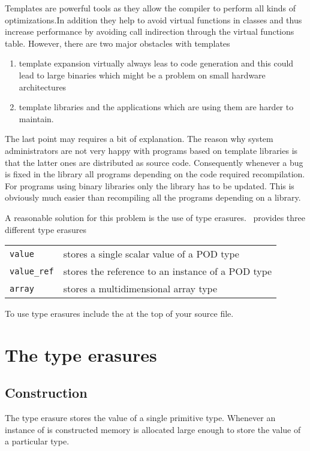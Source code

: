 
Templates are powerful tools as they allow the compiler to perform all kinds of
optimizations.In addition they help to avoid virtual functions in classes and
thus increase performance by avoiding call indirection through the virtual
functions table. However, there are two major obstacles with templates
\begin{enumerate}
\item template expansion virtually always leas to code generation and this could 
lead to large binaries which might be a problem on small hardware architectures
\item template libraries and the applications which are using them are harder 
to maintain. 
\end{enumerate}
The last point may requires a bit of explanation. The reason why system
administrators are not very happy with programs based on template libraries is
that the latter ones are distributed as source code. 
Consequently whenever a bug is fixed in the library all programs depending 
on the code required recompilation. For programs using binary libraries only the
library has to be updated. This is obviously much easier than recompiling 
all the programs depending on a library. 

A reasonable solution for this problem is the use of type erasures. 
\libpnicore\ provides three different type erasures
\begin{center}
\begin{tabular}{l | l}
\texttt{value} & stores a single scalar value of a POD type \\
\texttt{value\_ref} & stores the reference to an instance of a POD type \\
\texttt{array} & stores a multidimensional array type 
\end{tabular}
\end{center}
To use type erasures include the  at the top of
your source file.

\section{The  type erasures}

\subsection{Construction}
The  type erasure stores the value of a single primitive type. 
Whenever an instance of  is constructed memory is allocated 
large enough to store the value of a particular type. 


